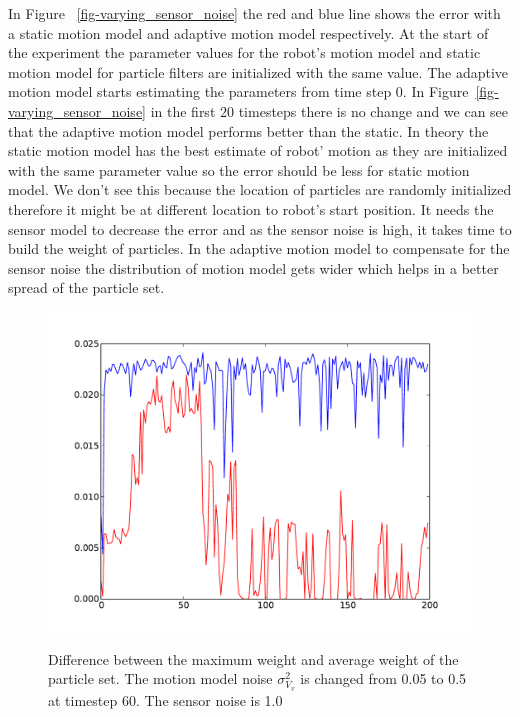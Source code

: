\documentclass[12pt]{dalcsthesis}
\begin{document}
In Figure ~\ref{fig-varying_sensor_noise} the red and blue line shows the error with a static motion model and adaptive motion model respectively. At the start of the experiment the parameter values for the robot's motion model and static motion model for particle filters are initialized with the same value. The adaptive motion model starts estimating the parameters from time step 0. In Figure~\ref{fig-varying_sensor_noise} in the first $20$ timesteps there is no change and we can see that the adaptive motion model performs better than the static. In theory the static motion model has the best estimate of robot' motion as they are initialized with the same parameter value so the error should be less for static motion model. We don't see this because the location of particles are randomly initialized therefore it might be at different location to robot's start position. It needs the sensor model to decrease the error and as the sensor noise is high, it takes time to build the weight of particles. In the 
adaptive motion model to compensate for the sensor noise the distribution of motion model gets wider which helps in a better spread of the particle set.


\begin{figure}[!ht]
  \centering
     {\includegraphics[height = 3.0 in]{./plots/200_005_05_s_10_max_weight.pdf}}
  \caption{\label{fig-varying_sensor_noise_sensor_model_max_weight} Difference between the maximum weight and average weight of the particle set. The motion model noise $\sigma_{V_{v}}^{2}$ is changed from 0.05 to 0.5 at timestep 60. The sensor noise is 1.0 }
\end{figure}
\end{document}
